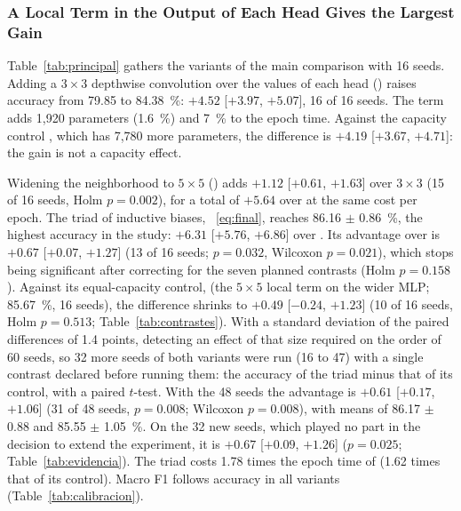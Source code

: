 

\subsubsection{A Local Term in the Output of Each Head Gives the Largest Gain}
\label{sec:res-principal}
Table~\ref{tab:principal} gathers the variants of the main comparison with 16 seeds. Adding a $3\times3$ depthwise convolution over the values of each head () raises accuracy from 79.85 to 84.38~\%: $+4.52$ [$+3.97$, $+5.07$], 16 of 16 seeds. The term adds 1,920 parameters (1.6~\%) and 7~\% to the epoch time. Against the capacity control , which has 7,780 more parameters, the difference is $+4.19$ [$+3.67$, $+4.71$]: the gain is not a capacity effect.

Widening the neighborhood to $5\times5$ () adds $+1.12$ [$+0.61$, $+1.63$] over $3\times3$ (15 of 16 seeds, Holm $p=0.002$), for a total of $+5.64$ over  at the same cost per epoch. The triad of inductive biases, ~\eqref{eq:final}, reaches 86.16 $\pm$ 0.86~\%, the highest accuracy in the study: $+6.31$ [$+5.76$, $+6.86$] over . Its advantage over  is $+0.67$ [$+0.07$, $+1.27$] (13 of 16 seeds; $p=0.032$, Wilcoxon $p=0.021$), which stops being significant after correcting for the seven planned contrasts (Holm $p=0.158$). Against its equal-capacity control,  (the $5\times5$ local term on the wider MLP; 85.67~\%, 16 seeds), the difference shrinks to $+0.49$ [$-0.24$, $+1.23$] (10 of 16 seeds, Holm $p=0.513$; Table~\ref{tab:contrastes}). With a standard deviation of the paired differences of 1.4 points, detecting an effect of that size required on the order of 60 seeds, so 32 more seeds of both variants were run (16 to 47) with a single contrast declared before running them: the accuracy of the triad minus that of its control, with a paired $t$-test. With the 48 seeds the advantage is $+0.61$ [$+0.17$, $+1.06$] (31 of 48 seeds, $p=0.008$; Wilcoxon $p=0.008$), with means of 86.17 $\pm$ 0.88 and 85.55 $\pm$ 1.05~\%. On the 32 new seeds, which played no part in the decision to extend the experiment, it is $+0.67$ [$+0.09$, $+1.26$] ($p=0.025$; Table~\ref{tab:evidencia}). The triad costs 1.78 times the epoch time of  (1.62 times that of its control). Macro F1 follows accuracy in all variants (Table~\ref{tab:calibracion}).




